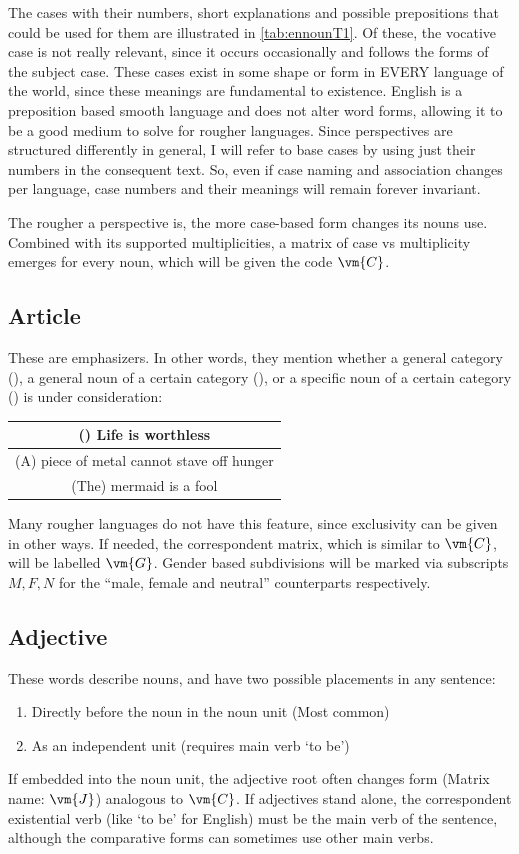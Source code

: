 The cases with their numbers, short explanations and possible prepositions that could be used for them are illustrated in \autoref{tab:ennounT1}. Of these, the vocative case is not really relevant, since it  occurs occasionally and  follows the forms of the subject case. These cases exist in some shape or form in EVERY language of the world, since these meanings are fundamental to existence. English is a preposition based smooth language and does not alter word forms, allowing it to be a good medium to solve for rougher languages. Since perspectives are structured differently in general, I will refer to base cases by using just their numbers in the consequent text. So, even if case naming and association changes per language, case numbers and their meanings will remain forever invariant. 

The rougher a perspective is, the more case-based form changes its nouns use. Combined with its supported multiplicities,  a matrix of case vs multiplicity emerges for every noun, which  will  be given the code $\vm{C}$.
\subsection{Article}
These are emphasizers. In other words, they mention whether  a general category (), a general noun of a certain category (), or a specific noun of a certain category () is under consideration:
\begin{example}
    \begin{tabular}{c}
    () Life is worthless \\\hline (A) piece of metal cannot  stave off hunger \\\hline (The) mermaid is a fool
    \end{tabular}
\end{example}
Many rougher languages do not have this feature, since exclusivity can be given in other ways.   If needed, the correspondent matrix, which is similar to $\vm{C}$, will be labelled $\vm{G}$. Gender based subdivisions  will be marked via subscripts $M,F,N$ for the \enquote{male, female and neutral} counterparts respectively.

\subsection{Adjective}
These words describe nouns, and have two possible placements in any sentence:
\begin{enumerate}
    \item Directly  before the noun in the noun unit (Most common)
    \item As an independent unit (requires main verb `to be')
\end{enumerate}
If embedded into the noun unit,   the adjective root often changes form  (Matrix name: $\vm{J}$) analogous to $\vm{C}$.  If adjectives stand alone, the correspondent existential verb (like `to be' for English) must be  the main verb of the sentence, although the comparative forms can  sometimes use other main verbs. 

